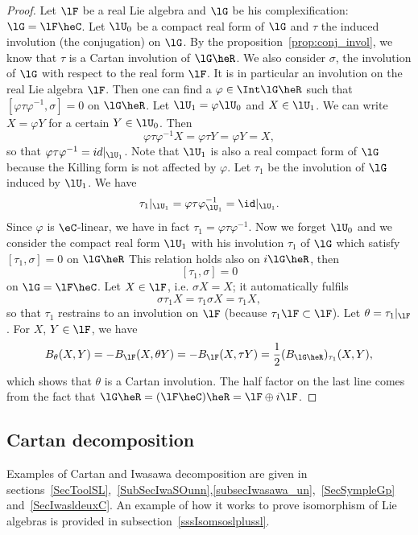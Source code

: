 \begin{proof}
Let $\lF$ be a real Lie algebra and $\lG$ be his complexification: $\lG=\lF\heC$. Let $\lU_0$ be a compact real form of $\lG$ and $\tau$ the induced involution (the conjugation) on $\lG$. By the proposition~\ref{prop:conj_invol}, we know that $\tau$ is  a Cartan involution of $\lG\heR$. We also consider $\sigma$, the involution of $\lG$ with respect to the real form $\lF$. It is in particular an involution on the real Lie algebra $\lF$. Then one can find a $\varphi\in\Int\lG\heR$ such that $[\varphi\tau\varphi^{-1},\sigma]=0$ on $\lG\heR$. Let $\lU_1=\varphi\lU_0$ and $X\in\lU_1$. We can write $X=\varphi Y$ for a certain $Y\in\lU_0$. Then
\[
   \varphi\tau\varphi^{-1} X=\varphi\tau Y=\varphi Y=X,
\]
so that $\varphi\tau\varphi^{-1}=id|_{\lU_1}$. Note that $\lU_1$ is also a real compact form of $\lG$ because the Killing form is not affected by $\varphi$. Let $\tau_1$ be the involution of $\lG$ induced by $\lU_1$. We have
\[
   \tau_1|_{\lU_1}=\varphi\tau\varphi^{-1}_{\lU_1}=\id|_{\lU_1}.
\]
Since $\varphi$ is $\eC$-linear, we have in fact $\tau_1=\varphi\tau\varphi^{-1}$. Now we forget $\lU_0$ and we consider the compact real form $\lU_1$ with his involution $\tau_1$ of $\lG$ which satisfy $[\tau_1,\sigma]=0$ on $\lG\heR$ This relation holds also on $i\lG\heR$, then
\[
   [\tau_1,\sigma]=0
\]
on $\lG=\lF\heC$. Let $X\in\lF$, i.e. $\sigma X=X$; it automatically fulfils
\[
  \sigma\tau_1 X=\tau_1\sigma X=\tau_1 X,
\]
so that $\tau_1$ restrains to an involution on $\lF$ (because $\tau_1\lF\subset\lF$). Let $\theta=\tau_1|_{\lF}$. For $X$, $Y\in\lF$, we have
\begin{equation}
B_{\theta}(X,Y)=-B_{\lF}(X, \theta Y)
             =-B_{\lF}(X,\tau Y)
         =\frac{1}{2}(B_{\lG\heR})_{\tau_1}(X,Y),
\end{equation}
which shows that $\theta$ is a Cartan involution. The half factor on the last line comes from the fact that $\lG\heR=(\lF\heC)\heR=\lF\oplus i\lF$.

\end{proof}

\subsection{Cartan decomposition}

Examples of Cartan and Iwasawa decomposition are given in sections~\ref{SecToolSL},~\ref{SubSecIwaSOunn},\ref{subsecIwasawa_un},~\ref{SecSympleGp} and~\ref{SecIwasldeuxC}. An example of how it works to prove isomorphism of Lie algebras is provided in subsection~\ref{sssIsomsoslplussl}.

